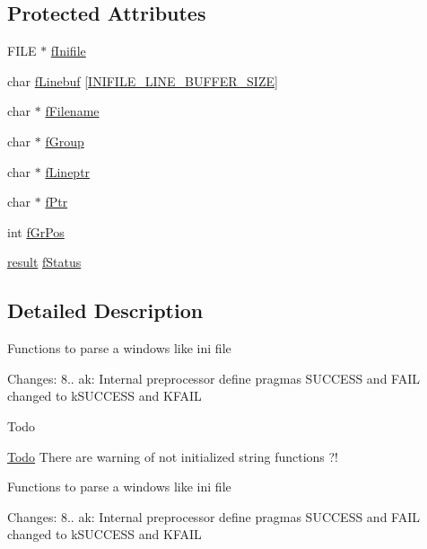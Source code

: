 \subsection*{Protected Attributes}
\begin{DoxyCompactItemize}
\item 
F\-I\-L\-E $\ast$ \hyperlink{classInifile_ae0124995e028778d1de49eee5cc5eca2}{f\-Inifile}
\item 
char \hyperlink{classInifile_a2be8f61e323dc6a9677952e2bf2e3815}{f\-Linebuf} \mbox{[}\hyperlink{minimal_2inifile_8h_a5d1e6b6f624980109358cdd755f3b3ae}{I\-N\-I\-F\-I\-L\-E\-\_\-\-L\-I\-N\-E\-\_\-\-B\-U\-F\-F\-E\-R\-\_\-\-S\-I\-Z\-E}\mbox{]}
\item 
char $\ast$ \hyperlink{classInifile_af0e8b673a17778eb70b22e35a6b328d2}{f\-Filename}
\item 
char $\ast$ \hyperlink{classInifile_a7a256617578ef60fde020cff47974cf6}{f\-Group}
\item 
char $\ast$ \hyperlink{classInifile_a7742de9155b0368dd608afdddbf679bf}{f\-Lineptr}
\item 
char $\ast$ \hyperlink{classInifile_ab1168d90990e04b72589184377fd07cc}{f\-Ptr}
\item 
int \hyperlink{classInifile_a534bb73b81dea9c6d4c540d6f666c8fc}{f\-Gr\-Pos}
\item 
\hyperlink{classInifile_a42a1cfa6fc8618c8b28d449626f0ecde}{result} \hyperlink{classInifile_a76e65bc01ffe98d10386326bcb814029}{f\-Status}
\end{DoxyCompactItemize}


\subsection{Detailed Description}
Functions to parse a windows like ini file

Changes\-: 8.. ak\-: Internal preprocessor define pragmas S\-U\-C\-C\-E\-S\-S and F\-A\-I\-L changed to k\-S\-U\-C\-C\-E\-S\-S and K\-F\-A\-I\-L

\begin{DoxyRefDesc}{Todo}
\item[\hyperlink{todo__todo000003}{Todo}]There are warning of not initialized string functions ?!\end{DoxyRefDesc}


Functions to parse a windows like ini file

Changes\-: 8.. ak\-: Internal preprocessor define pragmas S\-U\-C\-C\-E\-S\-S and F\-A\-I\-L changed to k\-S\-U\-C\-C\-E\-S\-S and K\-F\-A\-I\-L

